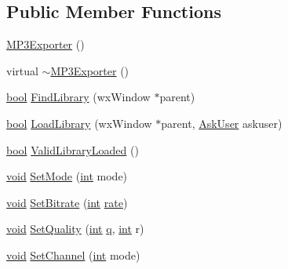 \subsection*{Public Member Functions}
\begin{DoxyCompactItemize}
\item 
\hyperlink{class_m_p3_exporter_a7bf3c250f77d055d762b7f9ad60a776f}{M\+P3\+Exporter} ()
\item 
virtual \hyperlink{class_m_p3_exporter_adc221596ee4535c668fa7ec79796f4ea}{$\sim$\+M\+P3\+Exporter} ()
\item 
\hyperlink{mac_2config_2i386_2lib-src_2libsoxr_2soxr-config_8h_abb452686968e48b67397da5f97445f5b}{bool} \hyperlink{class_m_p3_exporter_a8cdfe18fc2639bf49135e386e9768777}{Find\+Library} (wx\+Window $\ast$parent)
\item 
\hyperlink{mac_2config_2i386_2lib-src_2libsoxr_2soxr-config_8h_abb452686968e48b67397da5f97445f5b}{bool} \hyperlink{class_m_p3_exporter_a9a501f3e0e1a33a4ec56a37aa2620445}{Load\+Library} (wx\+Window $\ast$parent, \hyperlink{class_m_p3_exporter_af8a5ef69533b7ea5f45024f0af4e6e3d}{Ask\+User} askuser)
\item 
\hyperlink{mac_2config_2i386_2lib-src_2libsoxr_2soxr-config_8h_abb452686968e48b67397da5f97445f5b}{bool} \hyperlink{class_m_p3_exporter_a5ba33c8e79a37b64247e0e96d9db205a}{Valid\+Library\+Loaded} ()
\item 
\hyperlink{sound_8c_ae35f5844602719cf66324f4de2a658b3}{void} \hyperlink{class_m_p3_exporter_abc6ce7d76d8a5a8c2fe84c3d7dfe1aec}{Set\+Mode} (\hyperlink{xmltok_8h_a5a0d4a5641ce434f1d23533f2b2e6653}{int} mode)
\item 
\hyperlink{sound_8c_ae35f5844602719cf66324f4de2a658b3}{void} \hyperlink{class_m_p3_exporter_a4d291f4394824bd911a9268436390b94}{Set\+Bitrate} (\hyperlink{xmltok_8h_a5a0d4a5641ce434f1d23533f2b2e6653}{int} \hyperlink{seqread_8c_ad89d3fac2deab7a9cf6cfc8d15341b85}{rate})
\item 
\hyperlink{sound_8c_ae35f5844602719cf66324f4de2a658b3}{void} \hyperlink{class_m_p3_exporter_a246147e2385361be8eb4350bcf72e0c7}{Set\+Quality} (\hyperlink{xmltok_8h_a5a0d4a5641ce434f1d23533f2b2e6653}{int} \hyperlink{vqext_8h_aed566b4fd5f50587a3ee550f7cd010ae}{q}, \hyperlink{xmltok_8h_a5a0d4a5641ce434f1d23533f2b2e6653}{int} r)
\item 
\hyperlink{sound_8c_ae35f5844602719cf66324f4de2a658b3}{void} \hyperlink{class_m_p3_exporter_aa1890716027d5ddca561be1b813d72dc}{Set\+Channel} (\hyperlink{xmltok_8h_a5a0d4a5641ce434f1d23533f2b2e6653}{int} mode)
\item 

\end{DoxyCompactItemize}
